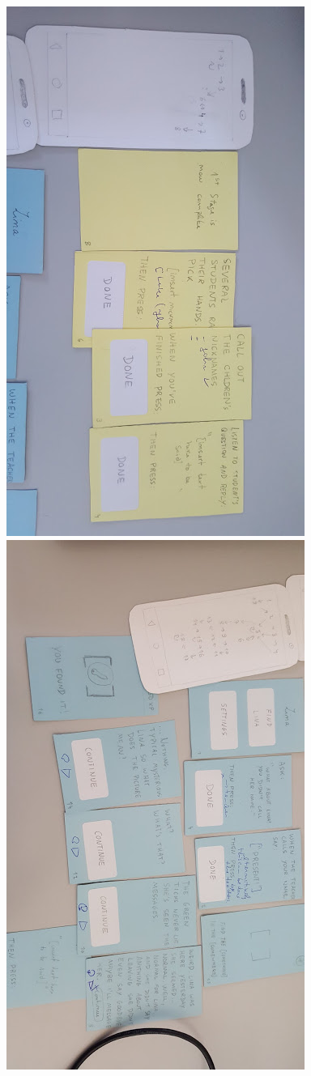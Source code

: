 \begin{figure}
    \centering
    \includegraphics[scale = 0.3, angle = 90]{paper_proto1.jpg}
    \includegraphics[scale = 0.3, angle = 90]{paper_proto2.jpg}

\end{figure}
